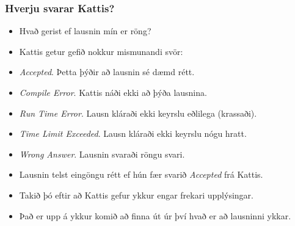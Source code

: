 \documentclass[handout]{beamer}
\newcommand\env[2]
{
	\begin{#1}
	#2
	\end{#1}
}
\begin{document}
\env{frame}
{
	\frametitle{Hverju svarar Kattis?}
	\env{itemize}
	{
		\item<1-> Hvað gerist ef lausnin mín er röng?
		\item<2-> Kattis getur gefið nokkur mismunandi svör:
		\item<3-> \emph{Accepted}. Þetta þýðir að lausnin sé dæmd rétt.
		\item<4-> \emph{Compile Error}. Kattis náði ekki að þýða lausnina.
		\item<5-> \emph{Run Time Error}. Lausn kláraði ekki keyrslu eðlilega (krassaði).
		\item<6-> \emph{Time Limit Exceeded}. Lausn kláraði ekki keyrslu nógu hratt.
		\item<7-> \emph{Wrong Answer}. Lausnin svaraði röngu svari.
		\item<8-> Lausnin telst eingöngu rétt ef hún fær svarið \emph{Accepted} frá Kattis.
	}
}

\env{frame}
{
	\env{itemize}
	{
		\item<1-> Takið þó eftir að Kattis gefur ykkur engar frekari upplýsingar.
		\item<2-> Það er upp á ykkur komið að finna út úr því hvað er að lausninni ykkar.
	}
}
\end{document}
